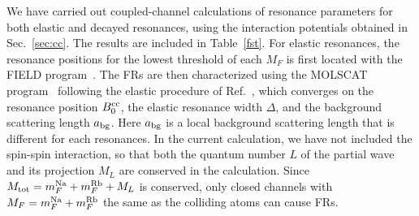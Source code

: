 We have carried out coupled-channel calculations of resonance parameters for both elastic and decayed resonances, using the interaction potentials obtained in Sec.~\ref{sec:cc}. The results are included in Table~\ref{fst}. For elastic resonances, the resonance positions for the lowest threshold of each $M_F$ is first located with the FIELD program~\cite{mbf-github:2020}. The FRs are then characterized using the MOLSCAT program~\cite{molscat:2019,mbf-github:2020} following the elastic procedure of Ref.~\cite{Frye2017}, which converges on the resonance position $B_0^{\rm cc}$, the elastic resonance width $\Delta$, and the background scattering length $a_{\rm bg}$. Here $a_{\rm bg}$ is a local background scattering length that is different for each resonances. In the current calculation, we have not included the spin-spin interaction, so that both the quantum number $L$ of the partial wave and its projection $M_L$ are conserved in the calculation. Since $M_{\rm tot} = m_F^{\rm Na}+m_F^{\rm Rb} + M_L$ is conserved, only closed channels with $M_F = m_F^{\rm Na}+m_F^{\rm Rb}$ the same as the colliding atoms can cause FRs.

